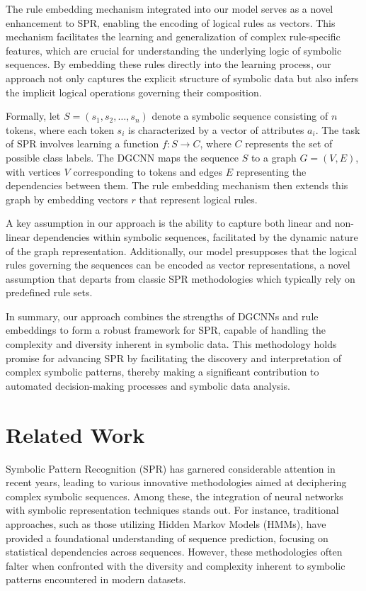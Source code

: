 \documentclass{article}
\begin{document}
The rule embedding mechanism integrated into our model serves as a novel enhancement to SPR, enabling the encoding of logical rules as vectors. This mechanism facilitates the learning and generalization of complex rule-specific features, which are crucial for understanding the underlying logic of symbolic sequences. By embedding these rules directly into the learning process, our approach not only captures the explicit structure of symbolic data but also infers the implicit logical operations governing their composition.

Formally, let \( S = (s_1, s_2, \ldots, s_n) \) denote a symbolic sequence consisting of \( n \) tokens, where each token \( s_i \) is characterized by a vector of attributes \( a_i \). The task of SPR involves learning a function \( f: S \rightarrow C \), where \( C \) represents the set of possible class labels. The DGCNN maps the sequence \( S \) to a graph \( G = (V, E) \), with vertices \( V \) corresponding to tokens and edges \( E \) representing the dependencies between them. The rule embedding mechanism then extends this graph by embedding vectors \( r \) that represent logical rules.

A key assumption in our approach is the ability to capture both linear and non-linear dependencies within symbolic sequences, facilitated by the dynamic nature of the graph representation. Additionally, our model presupposes that the logical rules governing the sequences can be encoded as vector representations, a novel assumption that departs from classic SPR methodologies which typically rely on predefined rule sets.

In summary, our approach combines the strengths of DGCNNs and rule embeddings to form a robust framework for SPR, capable of handling the complexity and diversity inherent in symbolic data. This methodology holds promise for advancing SPR by facilitating the discovery and interpretation of complex symbolic patterns, thereby making a significant contribution to automated decision-making processes and symbolic data analysis.

\section{Related Work}
Symbolic Pattern Recognition (SPR) has garnered considerable attention in recent years, leading to various innovative methodologies aimed at deciphering complex symbolic sequences. Among these, the integration of neural networks with symbolic representation techniques stands out. For instance, traditional approaches, such as those utilizing Hidden Markov Models (HMMs), have provided a foundational understanding of sequence prediction, focusing on statistical dependencies across sequences. However, these methodologies often falter when confronted with the diversity and complexity inherent to symbolic patterns encountered in modern datasets.
\end{document}
